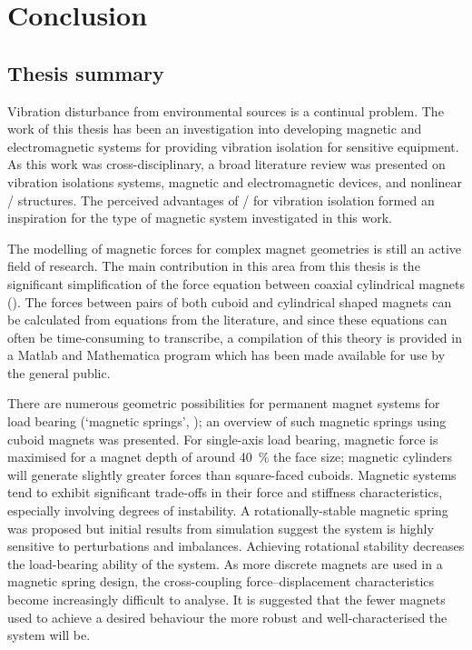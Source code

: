\documentclass[10pt,a4paper]{memoir}
\begin{document}
\chapter{Conclusion}


\section{Thesis summary}

Vibration disturbance from environmental sources is a continual problem.
The work of this thesis has been an investigation into developing magnetic and electromagnetic systems for providing vibration isolation for sensitive equipment.
As this work was cross-disciplinary, a broad literature review was presented on vibration isolations systems, magnetic and electromagnetic devices, and nonlinear \qzs/ structures.
The perceived advantages of \qzs/ for vibration isolation formed an inspiration for the type of magnetic system investigated in this work.

The modelling of magnetic forces for complex magnet geometries is still an active field of research.
The main contribution in this area from this thesis is the significant simplification of the force equation between coaxial cylindrical magnets ().
The forces between pairs of both cuboid and cylindrical shaped magnets can be calculated from equations from the literature, and since these equations can often be time-consuming to transcribe, a compilation of this theory is provided in a Matlab and Mathematica program which has been made available for use by the general public.

There are numerous geometric possibilities for permanent magnet systems for load bearing (`magnetic springs', ); an overview of such magnetic springs using cuboid magnets was presented.
For single-axis load bearing, magnetic force is maximised for a magnet depth of around \SI{40}{\%} the face size; magnetic cylinders will generate slightly greater forces than square-faced cuboids.
Magnetic systems tend to exhibit significant trade-offs in their force and stiffness characteristics, especially involving degrees of instability.
A rotationally-stable magnetic spring was proposed but initial results from simulation suggest the system is highly sensitive to perturbations and imbalances.
Achieving rotational stability decreases the load-bearing ability of the system.
As more discrete magnets are used in a magnetic spring design, the cross-coupling force--displacement characteristics become increasingly difficult to analyse.
It is suggested that the fewer magnets used to achieve a desired behaviour the more robust and well-characterised the system will be.
\end{document}
